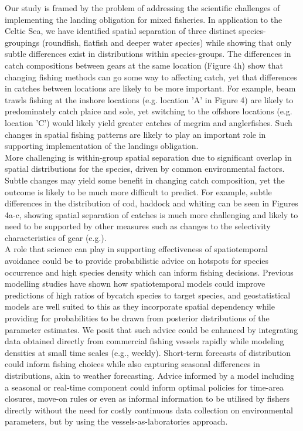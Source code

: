 \documentclass[fleqn,10pt]{wlscirep}
\begin{document}
\begin{linenumbers}
Our study is framed by the problem of addressing the scientific challenges of
implementing the landing obligation for mixed fisheries. In application to the
Celtic Sea, we have identified spatial separation of three distinct
species-groupings (roundfish, flatfish and deeper water species) while showing
that only subtle differences exist in distributions within species-groups. The
differences in catch compositions between gears at the same location (Figure
4h) show that changing fishing methods can go some way to affecting catch, yet
that differences in catches between locations are likely to be more important.
For example, beam trawls fishing at the inshore locations (e.g. location 'A' in
Figure 4) are likely to predominately catch plaice and sole, yet switching to
the offshore locations (e.g. location 'C') would likely yield greater catches
of megrim and anglerfishes.  Such changes in spatial fishing patterns are
likely to play an important role in supporting implementation of the landings
obligation.\\

More challenging is within-group spatial separation due to significant overlap
in spatial distributions for the species, driven by common environmental
factors. Subtle changes may yield some benefit in changing catch composition,
yet the outcome is likely to be much more difficult to predict. For example,
subtle differences in the distribution of cod, haddock and whiting can be seen
in Figures 4a-c, showing spatial separation of catches is much more challenging
and likely to need to be supported by other measures such as changes to the
selectivity characteristics of gear (e.g.\cite{Santos2016}). \\

A role that science can play in supporting effectiveness of spatiotemporal
avoidance could be to provide probabilistic advice on hotspots for species
occurrence and high species density which can inform fishing decisions.
Previous modelling studies have shown how spatiotemporal models could improve
predictions of high ratios of bycatch species to target species\cite{Ward2015,
	Cosandey-Godin2015, Breivik2016}, and geostatistical models are well
suited to this as they incorporate spatial dependency while providing for
probabilities to be drawn from posterior distributions of the parameter
estimates.  We posit that such advice could be enhanced by integrating data
obtained directly from commercial fishing vessels rapidly while modeling
densities at small time scales (e.g., weekly).  Short-term forecasts of
distribution could inform fishing choices while also capturing seasonal
differences in distributions, akin to weather forecasting.  Advice informed by
a model including a seasonal or real-time component could inform optimal
policies for time-area closures, move-on rules or even as informal information
to be utilised by fishers directly without the need for costly continuous data
collection on environmental parameters, but by using the
vessels-as-laboratories approach.\\


\end{linenumbers}
\end{document}
